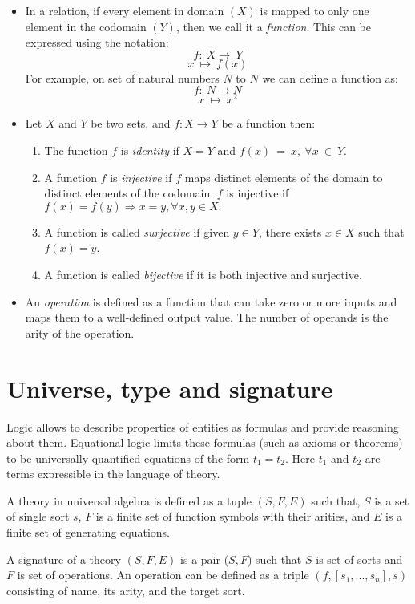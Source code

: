 \begin{itemize}
\item In a relation, if every element in domain $(X)$ is mapped to only one element in
the codomain $(Y)$, then we call it a \emph{function}. This can be expressed using the notation:
\[f:\ X \rightarrow\ Y\]
\[x \ \mapsto\ f(x)\]
For example, on set of natural numbers $N$ to $N$ we can define a function as:
\[f:\ N \rightarrow N\]
\[x \ \mapsto\ x^{2}\]   
\item Let $ X $ and $ Y $ be two sets, and $ f:X \rightarrow Y$ be a function then:
\begin{enumerate}
    \item The function $f$ is \textit{identity} if $X=Y$ and $f(x)\ =\ x,\
    \forall x\ \in \ Y$.
    \item A function $f$ is \emph{injective} if $f$ maps distinct elements of
    the domain to distinct elements of the codomain. $f$ is injective if
    $f(x)=f(y) \Rightarrow x = y, \forall x,y \in X.$
    \item A function is called \emph{surjective} if given $y \in Y$, there
    exists $x\in X$ such that $f(x) = y$.
    \item A function is called \emph{bijective} if it is both injective and
    surjective.
\end{enumerate}
\item An \emph{operation} is defined as a function that can take zero or more inputs
and maps them to a well-defined output value. The number of operands is the arity
of the operation.
\end{itemize}

\section{Universe, type and signature}
Logic allows to describe properties of entities as formulas and provide
reasoning about them. Equational logic limits these formulas (such as axioms or
theorems) to  be universally quantified equations of the form $t_1 = t_2$. Here
$t_1$ and $t_2$ are terms expressible in the language of theory.

A theory in universal algebra is defined as a tuple $(S,F,E)$ such that,
$S$ is a set of single sort $s$, $F$ is a finite set of function symbols with
their arities, and $E$ is a finite set of generating equations.

A signature of a theory $(S,F,E)$ is a pair ($S,F$) such that $S$ is set
of sorts and $F$ is set of operations. An operation can be defined as a triple
$(f,[s_1,...,s_n],s)$ consisting of name, its arity, and the target sort. 

